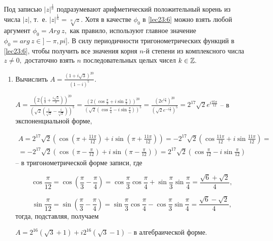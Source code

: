 \documentclass[../../main.tex]{subfiles}
\begin{document}
	Под записью $|z|^{\frac{1}{n}}$ подразумевают арифметический положительный
	корень из числа $|z|$, т.~е. $|z|^{\frac{1}{n}} = \sqrt[n]{z}.$ Хотя в
	качестве ${\phi}_0$ в \eqref{lec23:6} можно взять любой аргумент 
	${\phi}_0 = Arg\ z,$ как правило, используют главное значение 
	${\phi}_0 = arg\ z \in ]-\pi, pi].$ В силу периодичности тригонометрических
	функций в \eqref{lec23:6}, чтобы получить все значения корня $n$-й степени
	из комплексного числа $z\neq 0,$ достаточно взять $n$ последовательных целых
	чисел $k\in\mathbb{Z}.$
	
			\begin{examples}
		\;
		\begin{enumerate}
			\item Вычислить $A=\frac{(1+i\sqrt{3})^{20}}{(1-i)^5}.$
			
			$A = \frac{\left(2\left(\frac{1}{2}+\frac{i\sqrt{3}}{2}\right)
				\right)^{20}}{\left(\sqrt{2}\left(\frac{1}{\sqrt{2}}-\frac{i}
				{\sqrt{2}}\right)\right)^5} = \frac{\left(2\left(\cos \frac{\pi}
				{3}+i\sin \frac{\pi}{3}\right)\right)^{20}}{\left(\sqrt{2}\left(
				\cos \frac{\pi}{4}-i\sin \frac{\pi}{4}\right)\right)^5} =
			 \frac{\left(2e^{i\frac{\pi}{3}}\right)^{20}}{\left(\sqrt{2}
				e^{-i\frac{\pi}{4}}\right)^{5}} = 2^{17}\sqrt{2}e^
			{i\frac{95\pi}{12}}$ -- в экспоненциальной форме,
			
			\begin{multline*}A = 2^{17}\sqrt{2}\left(\cos \left(\pi+\frac{11\pi}
			{12}\right)+i\sin \left(\pi+\frac{11\pi}{12}\right)\right)= -2^{17}
			\sqrt{2}\left(\cos \frac{11\pi}{12}+i\sin \frac{11\pi}{12}\right)
			 = \\=-2^{17}\sqrt{2}\left(\cos \left(\pi-\frac{\pi}{12}\right)+
			 i\sin \left(\pi-\frac{\pi}{12}\right)\right)=2^{17}\sqrt{2}\left(
			 \cos \frac{\pi}{12}-i\sin \frac{\pi}{12}\right)\end{multline*}
			  -- в тригонометрической форме записи, где
					
			\[\cos \frac{\pi}{12} = \cos \left(\frac{\pi}{3} - 
			\frac{\pi}{4}\right) = \cos \frac{\pi}{3} \cos \frac{\pi}{4}
			+ \sin \frac{\pi}{3} \sin\frac{\pi}{4} =\frac{\sqrt{6}+\sqrt{2}}{4}
			,\]
			 
			 \[ \sin \frac{\pi}{12} = \sin \left(\frac{\pi}{3} - 
			 \frac{\pi}{4}\right) = \sin \frac{\pi}{3} \cos \frac{\pi}{4}
			 - \cos \frac{\pi}{3} \sin\frac{\pi}{4} =\frac{\sqrt{6}-
			 \sqrt{2}}{4},\] тогда,
			  подставляя, получаем
			 
			$ A =  2^{16}(\sqrt{3}+1) + i 2^{16}(\sqrt{3}-1)$ -- в
			алгебраической форме.
			 

\end{enumerate}
\end{examples}
\end{document}
